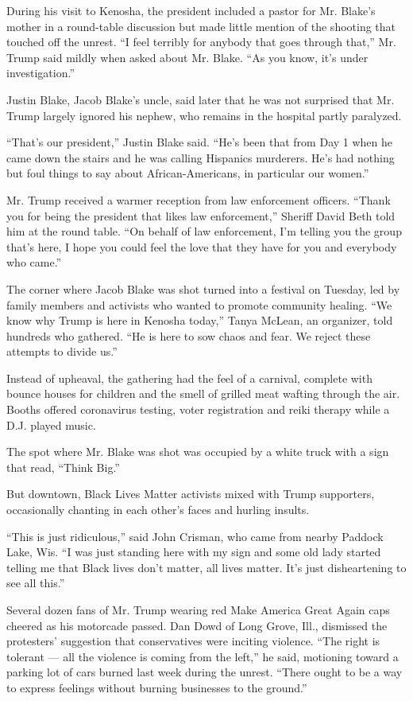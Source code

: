 During his visit to Kenosha, the president included a pastor for Mr.
Blake's mother in a round-table discussion but made little mention of
the shooting that touched off the unrest. ``I feel terribly for anybody
that goes through that,'' Mr. Trump said mildly when asked about Mr.
Blake. ``As you know, it's under investigation.''

Justin Blake, Jacob Blake's uncle, said later that he was not surprised
that Mr. Trump largely ignored his nephew, who remains in the hospital
partly paralyzed.

``That's our president,'' Justin Blake said. ``He's been that from Day 1
when he came down the stairs and he was calling Hispanics murderers.
He's had nothing but foul things to say about African-Americans, in
particular our women.''

Mr. Trump received a warmer reception from law enforcement officers.
``Thank you for being the president that likes law enforcement,''
Sheriff David Beth told him at the round table. ``On behalf of law
enforcement, I'm telling you the group that's here, I hope you could
feel the love that they have for you and everybody who came.''

The corner where Jacob Blake was shot turned into a festival on Tuesday,
led by family members and activists who wanted to promote community
healing. ``We know why Trump is here in Kenosha today,'' Tanya McLean,
an organizer, told hundreds who gathered. ``He is here to sow chaos and
fear. We reject these attempts to divide us.''

Instead of upheaval, the gathering had the feel of a carnival, complete
with bounce houses for children and the smell of grilled meat wafting
through the air. Booths offered coronavirus testing, voter registration
and reiki therapy while a D.J. played music.

The spot where Mr. Blake was shot was occupied by a white truck with a
sign that read, ``Think Big.''

But downtown, Black Lives Matter activists mixed with Trump supporters,
occasionally chanting in each other's faces and hurling insults.

``This is just ridiculous,'' said John Crisman, who came from nearby
Paddock Lake, Wis. ``I was just standing here with my sign and some old
lady started telling me that Black lives don't matter, all lives matter.
It's just disheartening to see all this.''

Several dozen fans of Mr. Trump wearing red Make America Great Again
caps cheered as his motorcade passed. Dan Dowd of Long Grove, Ill.,
dismissed the protesters' suggestion that conservatives were inciting
violence. ``The right is tolerant --- all the violence is coming from
the left,'' he said, motioning toward a parking lot of cars burned last
week during the unrest. ``There ought to be a way to express feelings
without burning businesses to the ground.''

